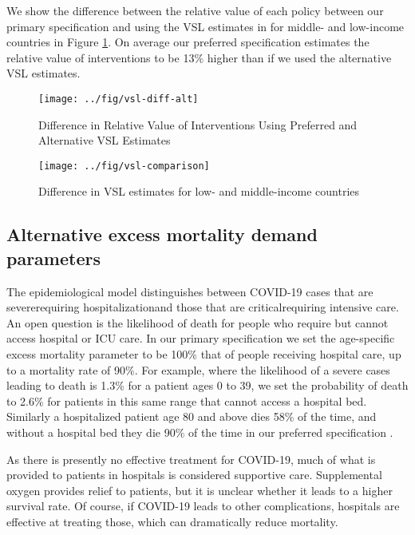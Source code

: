 \documentclass[11pt]{article}
\begin{document}
We show the difference between the relative value of each policy between our primary specification and using the VSL estimates in \textcite{robinson2019} for middle- and low-income countries in Figure \ref{fig:vsl-diff-alt}. On average our preferred specification estimates the relative value of interventions to be 13\% higher than if we used the alternative VSL estimates.   

\begin{figure}[htbp!]
\centering
\caption{Difference in Relative Value of Interventions Using Preferred and Alternative VSL Estimates}
\texttt{[image: ../fig/vsl-diff-alt]}
\label{fig:vsl-diff-alt}
\end{figure}


\begin{figure}[htbp!]
\centering
\caption{Difference in VSL estimates for low- and middle-income countries}
\texttt{[image: ../fig/vsl-comparison]}
\label{fig:vsl-comparison}
\end{figure}

\newpage
\subsection{Alternative excess mortality demand parameters}
\label{sec:alt-mortality}

The epidemiological model distinguishes between COVID-19 cases that are severe\textemdash requiring hospitalization\textemdash and those that are critical\textemdash requiring intensive care. An open question is the likelihood of death for people who require but cannot access hospital or ICU care. In our primary specification we set the age-specific excess mortality parameter to be 100\% that of people receiving hospital care, up to a mortality rate of 90\%. For example, where the likelihood of a severe cases leading to death is 1.3\% for a patient ages 0 to 39, we set the probability of death to 2.6\% for patients in this same range that cannot access a hospital bed. Similarly a hospitalized patient age 80 and above dies 58\% of the time, and without a hospital bed they die 90\% of the time in our preferred specification \parencite{verity2020,squire}. 

As there is presently no effective treatment for COVID-19, much of what is provided to patients in hospitals is considered supportive care. Supplemental oxygen provides relief to patients, but it is unclear whether it leads to a higher survival rate. Of course, if COVID-19 leads to other complications, hospitals are effective at treating those, which can dramatically reduce mortality.
\end{document}
